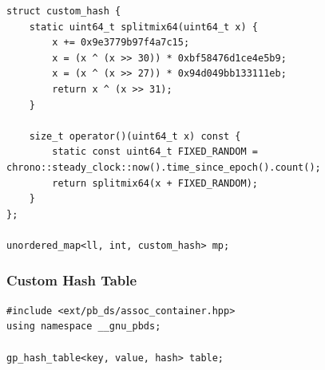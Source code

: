 \begin{verbatim}
struct custom_hash {
	static uint64_t splitmix64(uint64_t x) {
		x += 0x9e3779b97f4a7c15;
		x = (x ^ (x >> 30)) * 0xbf58476d1ce4e5b9;
		x = (x ^ (x >> 27)) * 0x94d049bb133111eb;
		return x ^ (x >> 31);
	}

	size_t operator()(uint64_t x) const {
		static const uint64_t FIXED_RANDOM = chrono::steady_clock::now().time_since_epoch().count();
		return splitmix64(x + FIXED_RANDOM);
	}
};

unordered_map<ll, int, custom_hash> mp;
\end{verbatim}

\subsubsection*{Custom Hash Table}
\begin{verbatim}
#include <ext/pb_ds/assoc_container.hpp>
using namespace __gnu_pbds;

gp_hash_table<key, value, hash> table;
\end{verbatim}